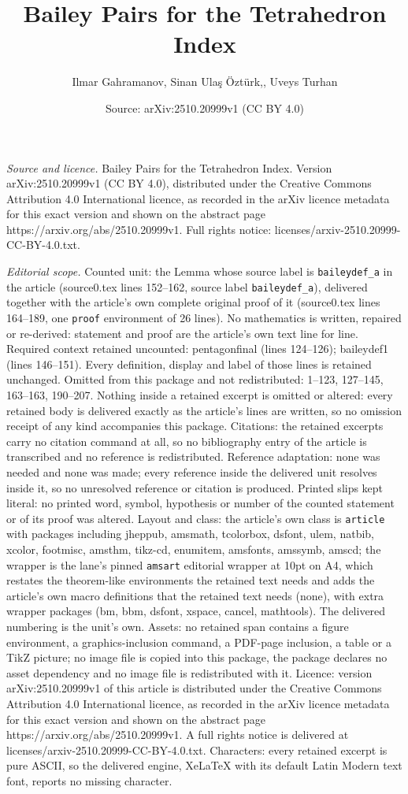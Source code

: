 \documentclass[10pt,a4paper]{amsart}
\title[Bailey Pairs for the Tetrahedron Index]{Bailey Pairs for the Tetrahedron Index}
\author{Ilmar Gahramanov, Sinan Ula\c{s} \"Ozt\"urk,, Uveys Turhan}
\date{Source: arXiv:2510.20999v1 (CC BY 4.0)}
\begin{document}
\maketitle

\noindent\emph{Source and licence.} Bailey Pairs for the Tetrahedron Index. Version arXiv:2510.20999v1 (CC BY 4.0), distributed under the Creative Commons Attribution 4.0 International licence, as recorded in the arXiv licence metadata for this exact version and shown on the abstract page https://arxiv.org/abs/2510.20999v1. Full rights notice: licenses/arxiv-2510.20999-CC-BY-4.0.txt.\par\smallskip

\noindent\textit{Editorial scope.} Counted unit: the Lemma whose source label is \texttt{baileydef\_a} in the article (source0.tex lines 152--162, source label \texttt{baileydef\_a}), delivered together with the article's own complete original proof of it (source0.tex lines 164--189, one \texttt{proof} environment of 26 lines). No mathematics is written, repaired or re-derived: statement and proof are the article's own text line for line. Required context retained uncounted: pentagonfinal (lines 124--126); baileydef1 (lines 146--151). Every definition, display and label of those lines is retained unchanged. Omitted from this package and not redistributed: 1--123, 127--145, 163--163, 190--207. Nothing inside a retained excerpt is omitted or altered: every retained body is delivered exactly as the article's lines are written, so no omission receipt of any kind accompanies this package. Citations: the retained excerpts carry no citation command at all, so no bibliography entry of the article is transcribed and no reference is redistributed. Reference adaptation: none was needed and none was made; every reference inside the delivered unit resolves inside it, so no unresolved reference or citation is produced. Printed slips kept literal: no printed word, symbol, hypothesis or number of the counted statement or of its proof was altered. Layout and class: the article's own class is \texttt{article} with packages including jheppub, amsmath, tcolorbox, dsfont, ulem, natbib, xcolor, footmisc, amsthm, tikz-cd, enumitem, amsfonts, amssymb, amscd; the wrapper is the lane's pinned \texttt{amsart} editorial wrapper at 10pt on A4, which restates the theorem-like environments the retained text needs and adds the article's own macro definitions that the retained text needs (none), with extra wrapper packages (bm, bbm, dsfont, xspace, cancel, mathtools). The delivered numbering is the unit's own. Assets: no retained span contains a figure environment, a graphics-inclusion command, a PDF-page inclusion, a table or a TikZ picture; no image file is copied into this package, the package declares no asset dependency and no image file is redistributed with it. Licence: version arXiv:2510.20999v1 of this article is distributed under the Creative Commons Attribution 4.0 International licence, as recorded in the arXiv licence metadata for this exact version and shown on the abstract page https://arxiv.org/abs/2510.20999v1. A full rights notice is delivered at licenses/arxiv-2510.20999-CC-BY-4.0.txt. Characters: every retained excerpt is pure ASCII, so the delivered engine, XeLaTeX with its default Latin Modern text font, reports no missing character.
\end{document}
